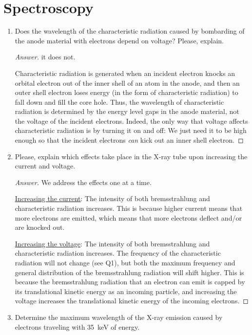 \documentclass[../psets.tex]{subfiles}
\begin{document}
\section{Spectroscopy}
\begin{enumerate}
    \item {}Does the wavelength of the characteristic radiation caused by bombarding of the anode material with electrons depend on voltage? Please, explain.
    \begin{proof}[Answer]
         it does not.\par
        Characteristic radiation is generated when an incident electron knocks an orbital electron out of the inner shell of an atom in the anode, and then an outer shell electron loses energy (in the form of characteristic radiation) to fall down and fill the core hole. Thus, the wavelength of characteristic radiation is determined by the energy level gaps in the anode material, not the voltage of the incident electrons. Indeed, the only way that voltage affects characteristic radiation is by turning it on and off: We just need it to be high enough so that the incident electrons \emph{can} kick out an inner shell electron.
    \end{proof}
    \item Please, explain which effects take place in the X-ray tube upon increasing the current and voltage.
    \begin{proof}[Answer]
        We address the effects one at a time.\par\smallskip
        \underline{Increasing the current}: The intensity of both bremsstrahlung and characteristic radiation increases. This is because higher current means that more electrons are emitted, which means that more electrons deflect and/or are knocked out.\par
        \underline{Increasing the voltage}: The intensity of both bremsstrahlung and characteristic radiation increases. The frequency of the characteristic radiation will not change (see Q1), but both the maximum frequency and general distribution of the bremsstrahlung radiation will shift higher. This is because the bremsstrahlung radiation that an electron can emit is capped by its translational kinetic energy as an incoming particle, and increasing the voltage increases the translational kinetic energy of the incoming electrons.
    \end{proof}
    \item Determine the maximum wavelength of the X-ray emission caused by electrons traveling with \SI{35}{\kilo\electronvolt} of energy.

\end{enumerate}
\end{document}

